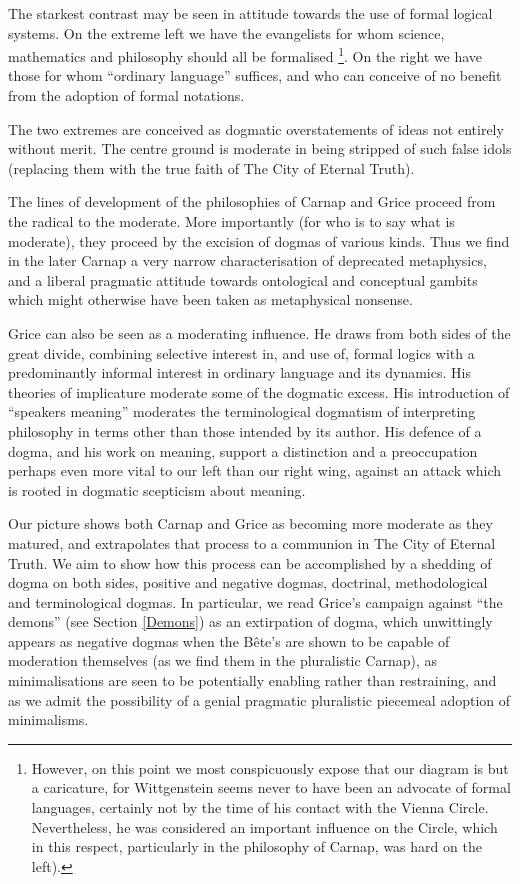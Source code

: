 \documentclass[10pt,titlepage]{book}
\begin{document}
The starkest contrast may be seen in attitude towards the use of formal logical systems.
On the extreme left we have the evangelists for whom science, mathematics and philosophy should all be formalised%
\footnote{However, on this point we most conspicuously expose that our diagram is but a caricature, for Wittgenstein seems never to have been an advocate of formal languages, certainly not by the time of his contact with the Vienna Circle.
Nevertheless, he was considered an important influence on the Circle, which in this respect, particularly in the philosophy of Carnap, was hard on the left).
}.
On the right we have those for whom ``ordinary language'' suffices, and who can conceive of no benefit from the adoption of formal notations.

The two extremes are conceived as dogmatic overstatements of ideas not entirely without merit.
The centre ground is moderate in being stripped of such false idols (replacing them with the true faith of The City of Eternal Truth).

The lines of development of the philosophies of Carnap and Grice proceed from the radical to the moderate.
More importantly (for who is to say what is moderate), they proceed by the excision of dogmas of various kinds.
Thus we find in the later Carnap a very narrow characterisation of deprecated metaphysics, and a liberal pragmatic attitude towards ontological and conceptual gambits which might otherwise have been taken as metaphysical nonsense.

Grice can also be seen as a moderating influence.
He draws from both sides of the great divide, combining selective interest in, and use of, formal logics with a predominantly informal interest in ordinary language and its dynamics.
His theories of implicature moderate some of the dogmatic excess.
His introduction of ``speakers meaning'' moderates the terminological dogmatism of interpreting philosophy in terms other than those intended by its author.
His defence of a dogma, and his work on meaning, support a distinction and a preoccupation perhaps even more vital to our left than our right wing, against an attack which is rooted in dogmatic scepticism about meaning.

Our picture shows both Carnap and Grice as becoming more moderate as they matured, and extrapolates that process to a communion in The City of Eternal Truth.
We aim to show how this process can be accomplished by a shedding of dogma on both sides, positive and negative dogmas, doctrinal, methodological and terminological dogmas.
In particular, we read Grice's campaign against ``the demons'' (see Section \ref{Demons}) as an extirpation of dogma, which unwittingly appears as negative dogmas when the B\^ete's are shown to be capable of moderation themselves (as we find them in the pluralistic Carnap), as minimalisations are seen to be potentially enabling rather than restraining, and as we admit the possibility of a genial pragmatic pluralistic piecemeal adoption of minimalisms.
\end{document}
